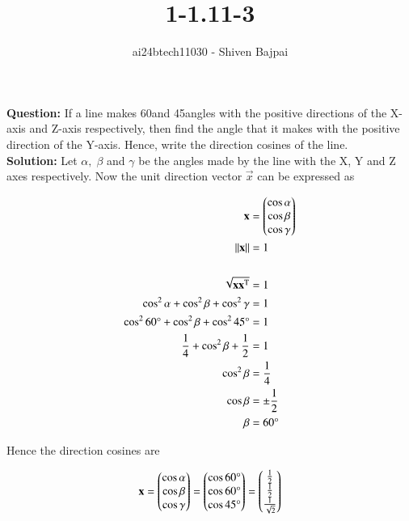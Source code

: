 \documentclass[journal]{IEEEtran}
\begin{document}
\onecolumn

\vspace{3cm}

\renewcommand{\thefigure}{\theenumi}
\renewcommand{\thetable}{\theenumi}

\title{1-1.11-3}
\author{ai24btech11030 - Shiven Bajpai}
\maketitle

\renewcommand{\thefigure}{\theenumi}
\renewcommand{\thetable}{\theenumi}

\textbf{Question: } If a line makes 60\degree  and 45\degree  angles with the positive directions of the X-axis and Z-axis respectively, then find the angle that it makes with the positive direction of the Y-axis. Hence, write the direction cosines of the line. 
\\

\textbf{Solution: } Let $\alpha,\; \beta$ and $\gamma$ be the angles made by the line with the X, Y and Z axes respectively. Now the unit direction vector $\vec{x}$ can be expressed as

\begin{align*}
	\mathbf{x} &= \begin{pmatrix}\cos\alpha\\\cos\beta\\\cos\gamma\end{pmatrix}\\
	\Vert\mathbf{x}\Vert &= 1\\
	\\
	\sqrt{\mathbf{x}\mathbf{x}^\text{T}} &= 1\\
	\cos^2\alpha + \cos^2\beta + \cos^2\gamma &= 1\\
	\cos^260\degree + \cos^2\beta + \cos^245\degree &= 1\\
	\frac{1}{4} + \cos^2\beta + \frac{1}{2} &= 1\\
	\cos^2\beta &= \frac{1}{4}\\
	\cos\beta &= \pm\frac{1}{2}\\
	\beta &= 60\degree\\
\end{align*}

Hence the direction cosines are

$$\mathbf{x} = \begin{pmatrix}\cos\alpha\\\cos\beta\\\cos\gamma\end{pmatrix} = \begin{pmatrix}\cos60\degree\\\cos60\degree\\\cos45\degree\end{pmatrix} = \begin{pmatrix}\frac{1}{2}\\\frac{1}{2}\\\frac{1}{\sqrt{2}}\end{pmatrix}$$
\end{document}
